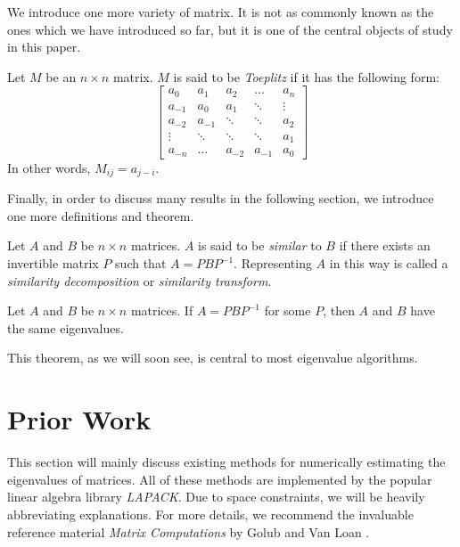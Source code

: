 \documentclass[10pt,twocolumn]{article}
\begin{document}
We introduce one more variety of matrix. It is not as commonly known as the ones which we have introduced so far, but it is one of the central objects of study in this paper.

\begin{definition}
    Let $M$ be an $n\times n$ matrix. $M$ is said to be \textit{Toeplitz} if it has the following form:
                         $$\begin{bmatrix}
a_0 & a_1 & a_2 & \dotsc & a_n \\
a_{-1} & a_0 & a_1 & \ddots & \vdots \\
a_{-2} & a_{-1} & \ddots & \ddots & a_2 \\
\vdots & \ddots & \ddots & \ddots & a_1 \\
a_{-n} & \dotsc & a_{-2} & a_{-1} & a_0 
\end{bmatrix}$$
In other words, $M_{ij}=a_{j-i}$.
\end{definition}

Finally, in order to discuss many results in the following section, we introduce one more definitions and theorem.

\begin{definition}
    Let $A$ and $B$ be $n\times n$ matrices. $A$ is said to be \textit{similar} to $B$ if there exists an invertible matrix $P$ such that $A=PBP^{-1}$. Representing $A$ in this way is called a \textit{similarity decomposition} or \textit{similarity transform}.
\end{definition}

\begin{thm}\cite{Kuttler_2021}
    Let $A$ and $B$ be $n\times n$ matrices. If $A=PBP^{-1}$ for some $P$, then $A$ and $B$ have the same eigenvalues. 
\end{thm}

This theorem, as we will soon see, is central to most eigenvalue algorithms.

\section{Prior Work}

This section will mainly discuss existing methods for numerically estimating the eigenvalues of matrices. All of these methods are implemented by the popular linear algebra library \textit{LAPACK}\cite{laug}. Due to space constraints, we will be heavily abbreviating explanations. For more details, we recommend the invaluable reference material \textit{Matrix Computations} by Golub and Van Loan \cite{Golub_Van_Loan_2013}.
\end{document}
